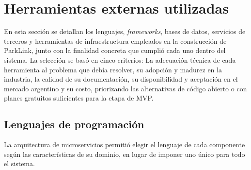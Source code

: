 \section{Herramientas externas utilizadas}\label{sec:herramientas}

En esta sección se detallan los lenguajes, \textit{frameworks}, bases de datos, servicios de terceros y herramientas de infraestructura empleados en la construcción de ParkLink, junto con la finalidad concreta que cumplió cada uno dentro del sistema. La selección se basó en cinco criterios: La adecuación técnica de cada herramienta al problema que debía resolver, su adopción y madurez en la industria, la calidad de su documentación, su disponibilidad y aceptación en el mercado argentino y su costo, priorizando las alternativas de código abierto o con planes gratuitos suficientes para la etapa de MVP.

\subsection{Lenguajes de programación}

La arquitectura de microservicios permitió elegir el lenguaje de cada componente según las características de su dominio, en lugar de imponer uno único para todo el sistema.

